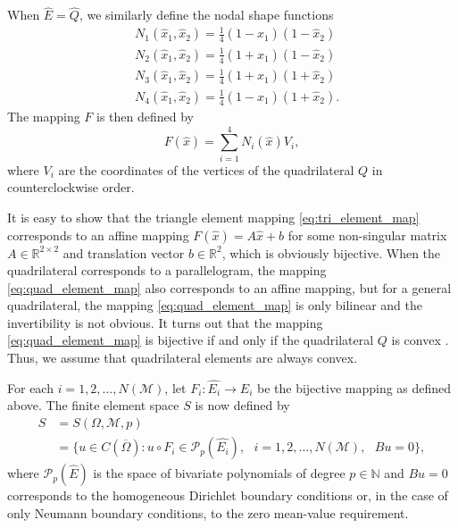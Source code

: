 \documentclass[english, 12pt, a4paper, sci, utf8, a-2b, online]{aaltothesis}
\theoremstyle{definition}
\theoremstyle{plain}
\numberwithin{equation}{section}
\begin{document}
When $\widehat{E} = \widehat{Q}$, we similarly define the nodal shape functions
\begin{align}
    \label{eq:quad_nodal_shape_start}
    &N_1(\hat{x}_1,\hat{x}_2) = \frac{1}{4}(1 - \hat{x}_1)(1 - \hat{x}_2) \\[0.5em]
    &N_2(\hat{x}_1,\hat{x}_2) = \frac{1}{4}(1 + \hat{x}_1)(1 - \hat{x}_2) \\[0.5em]
    &N_3(\hat{x}_1,\hat{x}_2) = \frac{1}{4}(1 + \hat{x}_1)(1 + \hat{x}_2) \\[0.5em]
    \label{eq:quad_nodal_shape_end}
    &N_4(\hat{x}_1,\hat{x}_2) = \frac{1}{4}(1 - \hat{x}_1)(1 + \hat{x}_2).
\end{align}
The mapping $F$ is then defined by
\begin{equation}
    \label{eq:quad_element_map}
    F(\hat{x}) = \sum_{i=1}^{4} N_i(\hat{x}) V_i,
\end{equation}
where $V_i$ are the coordinates of the vertices of the quadrilateral $Q$
in counterclockwise order.

It is easy to show that
the triangle element mapping \eqref{eq:tri_element_map}
corresponds to an affine mapping $F(\hat{x}) = A\hat{x} + b$
for some non-singular matrix $A \in \mathbb{R}^{2 \times 2}$
and translation vector $b \in \mathbb{R}^{2}$, which is obviously bijective.
When the quadrilateral corresponds to a parallelogram,
the mapping \eqref{eq:quad_element_map} also corresponds to an affine
mapping, but for a general quadrilateral, the mapping 
\eqref{eq:quad_element_map} is only bilinear and the invertibility is not obvious.
It turns out that the mapping \eqref{eq:quad_element_map} is bijective
if and only if the quadrilateral $Q$ is convex \cite[p.\ 158]{strang1973}.
Thus, we assume that quadrilateral elements are always convex.

For each $i=1,2,\dotsc,N(\mathcal{M})$,
let $F_i: \widehat{E_i} \to E_i$ be the bijective mapping as defined above.
The finite element space $S$ is now defined by
\begin{align}
    S
    &= S(\Omega, \mathcal{M}, p) \nonumber \\
    \label{eq:fem_space}
    &= \{
        u \in C(\overline{\Omega})
            : u \circ F_i \in \mathcal{P}_p(\widehat{E_i}),
                \text{ } i=1,2,\dotsc,N(\mathcal{M}),
                    \text{ } Bu = 0
    \},
\end{align}
where $\mathcal{P}_p(\widehat{E})$ is the space of
bivariate polynomials of degree $p \in \mathbb{N}$
and $Bu=0$ corresponds to the homogeneous Dirichlet boundary
conditions or, in the case of only Neumann boundary conditions,
to the zero mean-value requirement.
\end{document}
